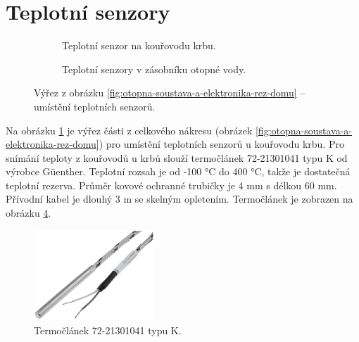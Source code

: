 \section{Teplotní senzory}
\label{sec:teplotni-senzory}

\begin{figure}[H]
\centering
\begin{subfigure}{.5\textwidth}
    \centering
    
    \caption{Teplotní senzor na kouřovodu krbu.}
    \label{fig:vyrez-teplotni-senzory-krb}
\end{subfigure}%
\begin{subfigure}{.5\textwidth}
   	\centering
   	
     \caption{Teplotní senzory v zásobníku otopné vody.}
    \label{fig:vyrez-teplotni-senzory-zasobnik-otopne-vody}
\end{subfigure}%
\caption[Výřez pro umístění teplotních senzorů.]{Výřez z obrázku \ref{fig:otopna-soustava-a-elektronika-rez-domu} – umístění teplotních senzorů.}
\end{figure}

Na obrázku \ref{fig:vyrez-teplotni-senzory-krb} je výřez části z celkového nákresu (obrázek \ref{fig:otopna-soustava-a-elektronika-rez-domu}) pro umístění teplotních senzorů u kouřovodu krbu. Pro snímání teploty z kouřovodů u krbů slouží termočlánek 72-21301041 \cite{termoclanek-k} typu K od výrobce Güenther. Teplotní rozsah je od -100 °C do 400 °C, takže je dostatečná teplotní rezerva. Průměr kovové ochranné trubičky je 4 mm s délkou 60 mm. Přívodní kabel je dlouhý 3 m se skelným opletením. Termočlánek je zobrazen na obrázku \ref{fig:termoclanek-72-21301041-k}.

\begin{figure}[H]
    \centering
    \includegraphics[width=0.4\textwidth]{images/termoclanek-72-21301041-k.png}
    \caption[Termočlánek 72-21301041 typu K.]{Termočlánek 72-21301041 typu K.}
    \label{fig:termoclanek-72-21301041-k}
\end{figure}


